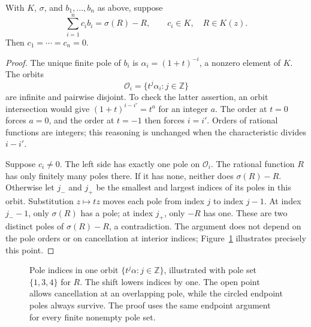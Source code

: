 \begin{lemma}\label{lem:poles}
With $K$, $\sigma$, and $b_1,\ldots,b_n$ as above, suppose
\[
 \sum_{i=1}^n c_i b_i=\sigma(R)-R,
 \qquad c_i\in K,\quad R\in K(z).
\]
Then $c_1=\cdots=c_n=0$.
\end{lemma}

\begin{proof}
The unique finite pole of $b_i$ is $\alpha_i=(1+t)^{-i}$, a nonzero
element of $K$. The orbits
\[
 \mathcal O_i=\{t^j\alpha_i:j\in\mathbb Z\}
\]
are infinite and pairwise disjoint. To check the latter assertion, an orbit
intersection would give $(1+t)^{i-i'}=t^a$ for an integer $a$.
The order at $t=0$ forces $a=0$, and the order at $t=-1$ then forces
$i=i'$. Orders of rational functions are integers; this reasoning is
unchanged when the characteristic divides $i-i'$.

Suppose $c_i\ne0$. The left side has exactly one pole on $\mathcal O_i$.
The rational function $R$ has only finitely many poles there.
If it has none, neither does $\sigma(R)-R$. Otherwise let $j_-$ and $j_+$
be the smallest and largest indices of its poles in this orbit.
Substitution $z\mapsto tz$ moves each pole from index $j$ to index $j-1$.
At index $j_--1$, only $\sigma(R)$ has a pole; at index $j_+$, only $-R$
has one. These are two distinct poles of $\sigma(R)-R$, a contradiction.
The argument does not depend on the pole orders or on cancellation at
interior indices; Figure~\ref{fig:poles} illustrates precisely this point.
\end{proof}

\begin{figure}[tb]
\centering
{}
\caption{Pole indices in one orbit $\{t^j\alpha:j\in\mathbb Z\}$,
illustrated with pole set $\{1,3,4\}$ for $R$.
The shift lowers indices by one. The open point allows cancellation at
an overlapping pole, while the circled endpoint poles always survive.
The proof uses the same endpoint argument for every finite nonempty pole set.}
\label{fig:poles}
\end{figure}
\FloatBarrier

